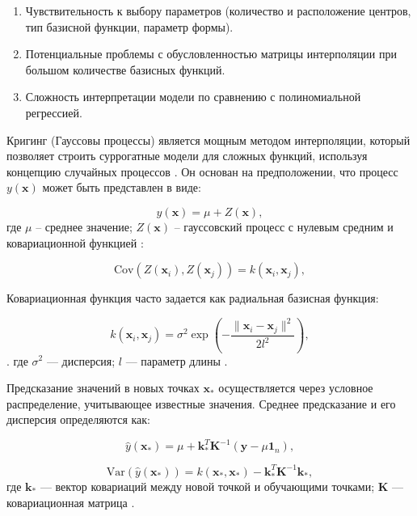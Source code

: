 \begin{enumerate}
    \item Чувствительность к выбору параметров (количество и расположение центров, тип базисной функции, параметр формы).
    \item Потенциальные проблемы с обусловленностью матрицы интерполяции при большом количестве базисных функций.
    \item Сложность интерпретации модели по сравнению с полиномиальной регрессией.
\end{enumerate}

\label{sec:ch4/sec2/subsec1/subsubsec3}

Кригинг (Гауссовы процессы) является мощным методом интерполяции,
который позволяет строить суррогатные модели для сложных функций,
используя концепцию случайных процессов \cite{gramacy2020surrogates}. Он основан
на предположении, что процесс \( y(\mathbf{x}) \) может быть представлен в виде:

\begin{equation*}
    y(\mathbf{x}) = \mu + Z(\mathbf{x}),
\end{equation*}
где $\mu$ -- среднее значение; $Z(\mathbf{x})$ -- гауссовский процесс с нулевым средним и
ковариационной функцией \cite{marrel2024probabilistic}:

\begin{equation*}
    \text{Cov}(Z(\mathbf{x}_i), Z(\mathbf{x}_j)) = k(\mathbf{x}_i, \mathbf{x}_j),
\end{equation*}

Ковариационная функция часто задается как радиальная базисная функция:

\begin{equation*}
    k(\mathbf{x}_i, \mathbf{x}_j) = \sigma^2 \exp\left(-\frac{\|\mathbf{x}_i - \mathbf{x}_j\|^2}{2l^2}\right),
\end{equation*}.
где \( \sigma^2 \) — дисперсия;
$l$ — параметр длины \cite{figueroa2021gaussian}.

Предсказание значений в новых точках $\mathbf{x}_*$ осуществляется через условное распределение, учитывающее известные значения.
Среднее предсказание и его дисперсия определяются как:

\begin{equation*}
    \hat{y}(\mathbf{x}_*) = \mu + \mathbf{k}_*^T \mathbf{K}^{-1} (\mathbf{y} - \mu \mathbf{1}_n),
\end{equation*}

\begin{equation*}
    \text{Var}(\hat{y}(\mathbf{x}_*)) = k(\mathbf{x}_*, \mathbf{x}_*) - \mathbf{k}_*^T \mathbf{K}^{-1} \mathbf{k}_*,
\end{equation*}
где $\mathbf{k}_*$ — вектор ковариаций между новой точкой и обучающими точками;
$\mathbf{K}$ — ковариационная матрица \cite{zhou2020enhanced}.

